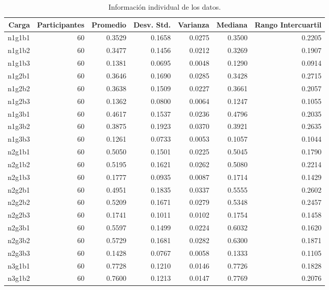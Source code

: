\documentclass{article}
\begin{document}
\begin{table}[htb]
    \centering
    \caption{Informaci\'on individual de los datos.} 
    \begin{tabular}{|r|r|r|r|r|r|r|}
    \hline
    Carga & Participantes & Promedio & Desv. Std. & Varianza & Mediana & Rango Intercuartil  \\
    \hline
    n1g1b1 & 60 & 0.3529 & 0.1658 & 0.0275 & 0.3500 & 0.2205 \\
    \hline
    n1g1b2 & 60 & 0.3477 & 0.1456 & 0.0212 & 0.3269 & 0.1907 \\
    \hline
    n1g1b3 & 60 & 0.1381 & 0.0695 & 0.0048 & 0.1290 & 0.0914 \\
    \hline
    n1g2b1 & 60 & 0.3646 & 0.1690 & 0.0285 & 0.3428 & 0.2715 \\
    \hline
    n1g2b2 & 60 & 0.3638 & 0.1509 & 0.0227 & 0.3661 & 0.2057 \\
    \hline
    n1g2b3 & 60 & 0.1362 & 0.0800 & 0.0064 & 0.1247 & 0.1055 \\
    \hline
    n1g3b1 & 60 & 0.4617 & 0.1537 & 0.0236 & 0.4796 & 0.2035 \\
    \hline
    n1g3b2 & 60 & 0.3875 & 0.1923 & 0.0370 & 0.3921 & 0.2635 \\
    \hline
    n1g3b3 & 60 & 0.1261 & 0.0733 & 0.0053 & 0.1057 & 0.1044 \\
    \hline
    n2g1b1 & 60 & 0.5050 & 0.1501 & 0.0225 & 0.5045 & 0.1790 \\
    \hline
    n2g1b2 & 60 & 0.5195 & 0.1621 & 0.0262 & 0.5080 & 0.2214 \\
    \hline
    n2g1b3 & 60 & 0.1777 & 0.0935 & 0.0087 & 0.1714 & 0.1429 \\
    \hline
    n2g2b1 & 60 & 0.4951 & 0.1835 & 0.0337 & 0.5555 & 0.2602 \\
    \hline
    n2g2b2 & 60 & 0.5209 & 0.1671 & 0.0279 & 0.5348 & 0.2457 \\
    \hline
    n2g2b3 & 60 & 0.1741 & 0.1011 & 0.0102 & 0.1754 & 0.1458 \\
    \hline
    n2g3b1 & 60 & 0.5597 & 0.1499 & 0.0224 & 0.6032 & 0.1620 \\
    \hline
    n2g3b2 & 60 & 0.5729 & 0.1681 & 0.0282 & 0.6300 & 0.1871 \\
    \hline
    n2g3b3 & 60 & 0.1428 & 0.0767 & 0.0058 & 0.1333 & 0.1105 \\
    \hline
    n3g1b1 & 60 & 0.7728 & 0.1210 & 0.0146 & 0.7726 & 0.1828 \\
    \hline
    n3g1b2 & 60 & 0.7600 & 0.1213 & 0.0147 & 0.7769 & 0.2076 \\

\end{tabular}
\end{table}
\end{document}
